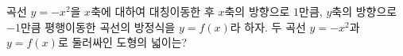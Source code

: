 곡선 $y=-x^2$을 $x$축에 대하여 대칭이동한 후 $x$축의 방향으로 $1$만큼, $y$축의 방향으로 $-1$만큼 평행이동한 곡선의 방정식을 $y=f(x)$라 하자. 두 곡선 $y=-x^2$과 $y=f(x)$로 둘러싸인 도형의 넓이는?
